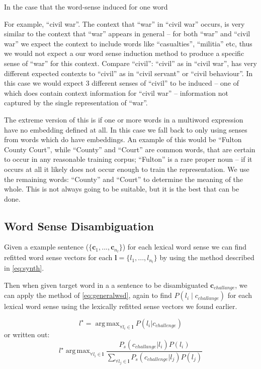 \documentclass{sig-alternate}
\renewcommand{\c}{\mathbf{c}}
\renewcommand{\l}{\mathbf{l}}
\DeclareMathOperator*{\argmax}{arg\,max}
\begin{document}
In the case that the word-sense induced for one word 

For example, ``civil war''. The context that ``war'' in ``civil war'' occurs, is very similar to the context that ``war'' appears in general -- for both ``war'' and ``civil war'' we expect the context to include words like ``casualties'', ``militia'' etc, thus we would not expect a our word sense induction method to produce a specific sense of ``war'' for this context.
Compare ``civil'': ``civil'' as in ``civil war'', has very different expected contexts to ``civil'' as in ``civil servant'' or ``civil behaviour''. In this case we would expect 3 different senses of ``civil'' to be induced -- one of which does contain context information for ``civil war'' -- information not captured by the single representation of ``war''.

The extreme version of this is if one or more words in a multiword expression have no embedding defined at all. In this case we fall back to only using senses from words which do have embeddings. An example of this would be ``Fulton County Court'', while ``County'' and ``Court'' are common words, that are certain to occur in any reasonable training corpus; ``Fulton'' is a rare proper noun -- if it occurs at all it likely does not occur enough to train the representation. We use the remaining words: ``County'' and ``Court'' to determine the meaning of the whole. This is not always going to be suitable, but it is the best that can be done.


\subsection{Word Sense Disambiguation}
Given a example sentence ($\{\c_1,...,\c_{n_l}\}$) for each lexical word sense we can find refitted word sense vectors for each $\l=\{l_1,..., l_{n_l}\}$ by using the method described in \cref{eq:synth}. 

Then when given target word in a a sentence to be disambiguated $\c_{challange}$, we can apply the method of \cref{eq:generalwsd}, again to find $P(l_i \mid c_{challange})$ for each lexical word sense using the lexically refitted sense vectors we found earlier.

\begin{equation}\label{eq:lexicalwsd}
l^\star = \argmax_{\forall l_i \in \l} P(l_i|c_{challenge})
\end{equation}
or written out:
\begin{equation}\label{eq:lexicalwsdexpanded}
l^\star \argmax_{\forall l_i \in \l} \frac{P_s(c_{challange}|l_i)P(l_i)}{\sum_{\forall l_j \in \l} P_s(c_{challenge}|l_j)P(l_j)}
\end{equation}
\end{document}
